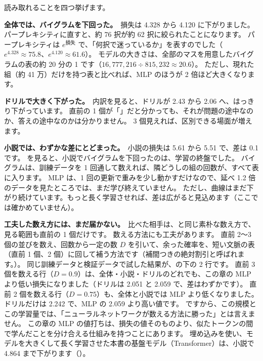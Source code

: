読み取れることを四つ挙げます。

\textbf{全体では、バイグラムを下回った。}\
損失は 4.328 から 4.120 に下がりました。
パープレキシティに直すと、約 76 択が約 62 択に絞られたことになります。
パープレキシティは $e^{\text{損失}}$ で、「何択で迷っているか」を表すのでした（$e^{4.328}\approx75.8$、$e^{4.120}\approx61.6$）。
モデルの大きさは、全部のマスを用意したバイグラムの表の約 20 分の 1 です（$16{,}777{,}216\div815{,}232\approx20.6$）。
ただし、現れた組（約 41 万）だけを持つ表と比べれば、MLP のほうが 2 倍ほど大きくなります。

\textbf{ドリルで大きく下がった。}\
内訳を見ると、ドリルが 2.43 から 2.06 へ、はっきり下がっています。
直前の 1 個が「」だと分かっても、それが問題の途中なのか、答えの途中なのかは分かりません。
3 個見えれば、区別できる場面が増えます。

\textbf{小説では、わずかな差にとどまった。}\
小説の損失は 5.61 から 5.51 で、差は 0.1 です。
を見ると、小説でバイグラムを下回ったのは、学習の終盤でした。
バイグラムは、訓練データを 1 回通して数えれば、隣どうしの組の回数が、すべて表に入ります。
MLP は、1 回の更新で重みを少し動かすだけなので、延べ 1.2 倍のデータを見たところでは、まだ学び終えていません。
ただし、曲線はまだ下がり続けています。もっと長く学習させれば、差は広がると見込めます（ここでは確かめていません）。

\textbf{工夫した数え方には、まだ届かない。}\
比べた相手は、\chapref{ch:lm}と同じ素朴な数え方で、見る範囲も直前の 1 個だけです。
数える方法にも工夫があります。
直前 2〜3 個の並びを数え、回数から一定の数 $D$ を引いて、余った確率を、短い文脈の表（直前 1 個、2 個）に回して補う方法です（補間つきの絶対割引と呼ばれます。）。
同じ訓練データと検証データで試した結果が、の下の 2 行です。
直前 3 個を数える行（$D=0.9$）は、全体・小説・ドリルのどれでも、この章の MLP より低い損失になりました（ドリルは 2.051 と 2.059 で、差はわずかです）。
直前 2 個を数える行（$D=0.75$）も、全体と小説では MLP より低くなりました。ドリルだけは 2.242 で、MLP の 2.059 より高い値です。
ですから、この規模とこの学習量では、「ニューラルネットワークが数える方法に勝った」とは言えません。
この章の MLP の値打ちは、損失の値そのものより、似たトークンの間で学んだことを分け合える仕組みを持つことにあります。
埋め込みを使い、モデルを大きくして長く学習させた本書の基盤モデル（Transformer）は、小説で 4.864 まで下がります（\tabref{tab:emb-rnn}）。

